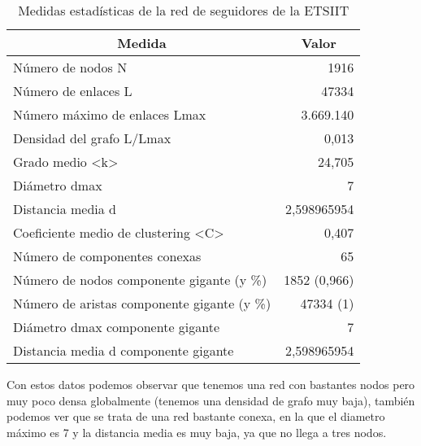 \begin{table}[H]
\centering
\begin{tabular}{|l|r|}
\hline
\multicolumn{1}{|c|}{\textbf{Medida}}                      & \multicolumn{1}{c|}{\textbf{Valor}} \\ \hline
Número de nodos N                                          & 1916                                \\ \hline
Número de enlaces L                                        & 47334                               \\ \hline
Número máximo de enlaces Lmax                              & 3.669.140                           \\ \hline
Densidad del grafo L/Lmax                                  & 0,013                               \\ \hline
Grado medio \textless{}k\textgreater{}                     & 24,705                              \\ \hline
Diámetro dmax                                              & 7                                   \\ \hline
Distancia media d                                          & 2,598965954                         \\ \hline
Coeficiente medio de clustering \textless{}C\textgreater{} & 0,407                               \\ \hline
Número de componentes conexas                              & 65                                  \\ \hline
Número de nodos componente gigante (y \%)                  & 1852 (0,966)                        \\ \hline
Número de aristas componente gigante (y \%)                & 47334 (1)                           \\ \hline
Diámetro dmax componente gigante                           & 7                                   \\ \hline
Distancia media d componente gigante                       & 2,598965954                         \\ \hline
\end{tabular}%
\caption{Medidas estadísticas de la red de seguidores de la ETSIIT}
\end{table}

Con estos datos podemos observar que tenemos una red con bastantes nodos pero muy poco densa globalmente (tenemos una densidad de grafo muy baja), también podemos ver que se trata de una red bastante conexa, en la que el diametro máximo es 7 y la distancia media es muy baja, ya que no llega a tres nodos.

